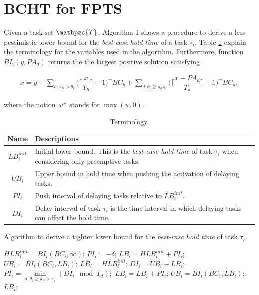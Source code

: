\documentclass[fleqn]{article}
\begin{document}
\section{BCHT for FPTS}

Given a task-set $\mathpzc{T}$, Algorithm 1 shows a procedure to derive a less pessimistic lower bound for the \textit{best-case hold time} of a task $\tau_i$. Table \ref{tab:terminology} explain the terminology for the variables used in the algorithm. Furthermore, function $BI_i(y,PA_d)$ returns the the largest positive solution satisfying

\begin{align}
x = y + \sum\limits_{h:\pi_h > \theta_i} \Big( \Big\lceil  \dfrac{x}{T_h}\Big\rceil -1 \Big)^+  BC_h + \sum\limits_{d:\theta_i \geq \pi_d \pi_i} \Big( \Big\lceil  \dfrac{x-PA_d}{T_d}\Big\rceil -1 \Big)^+  BC_d,
\end{align}

\noindent
where the notion $w^+$ stands for $\max(w,0)$.

\begin{table}[H]
	\center
	\caption{Terminology.}
	\label{tab:terminology}
	\begin{tabular}{|c | p{8cm}|}
		\hline
		Name & Descriptions \\ 
		\hline 
		\hline
		$LB^{init}_i$& Initial lower bound. This is the \textit{best-case hold time} of task $\tau_i$ when considering only preemptive tasks.\\
		\hline
		$UB_i$& Upper bound in hold time when pushing the activation of delaying tasks. \\ 
		\hline
		$PI_i$ & Push interval of delaying tasks relative to $LB^{init}_i$.   \\ 
		\hline
		$DI_i$ & Delay interval of task $\tau_i$ is the time interval in which delaying tasks can affect the hold time.\\
		\hline 
	\end{tabular}
\end{table} 

\begin{algorithm}[H]
	\caption{Algorithm to derive a tighter lower bound for the \textit{best-case hold time} of task $\tau_i$.}\label{euclid}
	\begin{algorithmic}[1]
		\State $HLB^{init}_i = BI_i(BC_i,\infty)$;
		\State $PI_i = -\delta$;
		\State $LB_i = HLB^{init}_i + PI_i$;
		\State $UB_i = BI_i(BC_i,LB_i)$;
		\State $LB_i = HLB^{init}_i$;
		\State $DI_i = UB_i - LB_i$;
		\State $PI_i = \min \limits_{d:\theta_i \geq \pi_d > \pi_i} (DI_i \mod T_d);$
		\State $LB_i = LB_i + PI_i$;
		\State $UB_i = BI_i(BC_i,LB_i)$;
		\State \Return $LB_i$; 
		\EndProcedure
	\end{algorithmic}
\end{algorithm}
\end{document}
